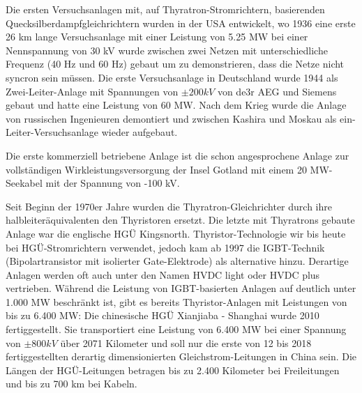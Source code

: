 Die ersten Versuchsanlagen mit, auf Thyratron-Stromrichtern, basierenden Quecksilberdampfgleichrichtern wurden in der USA entwickelt, wo 1936 eine erste 26 km lange Versuchsanlage mit einer Leistung von 5.25 MW bei einer Nennspannung von 30 kV wurde zwischen zwei Netzen mit unterschiedliche Frequenz (40 Hz und 60 Hz) gebaut um zu demonstrieren, dass die Netze nicht syncron sein müssen. Die erste Versuchsanlage in Deutschland wurde 1944 als Zwei-Leiter-Anlage mit Spannungen von $\pm 200 kV$ von de3r AEG und Siemens gebaut und hatte eine Leistung von 60 MW. Nach dem Krieg wurde die Anlage von russischen Ingenieuren demontiert und zwischen Kashira und Moskau als ein-Leiter-Versuchsanlage wieder aufgebaut.

Die erste kommerziell betriebene Anlage ist die schon angesprochene Anlage zur vollständigen Wirkleistungsversorgung der Insel Gotland mit einem 20 MW-Seekabel mit der Spannung von -100 kV.

Seit Beginn der 1970er Jahre wurden die Thyratron-Gleichrichter durch ihre halbleiteräquivalenten den Thyristoren ersetzt. Die letzte mit Thyratrons gebaute Anlage war die englische HGÜ Kingsnorth. Thyristor-Technologie wir bis heute bei HGÜ-Stromrichtern verwendet, jedoch kam ab 1997 die IGBT-Technik (Bipolartransistor mit isolierter Gate-Elektrode) als alternative hinzu. Derartige Anlagen werden oft auch unter den Namen HVDC light oder HVDC plus vertrieben.
Während die Leistung von IGBT-basierten Anlagen auf deutlich unter 1.000 MW beschränkt ist, gibt es bereits Thyristor-Anlagen mit Leistungen von bis zu 6.400 MW:
Die chinesische HGÜ Xianjiaba - Shanghai wurde 2010 fertiggestellt.\cite{Kao}
Sie transportiert eine Leistung von 6.400 MW bei einer Spannung von $\pm800 kV$ über 2071 Kilometer und
soll nur die erste von 12 bis 2018 fertiggestellten derartig dimensionierten Gleichstrom-Leitungen in China sein.\cite{Liste}
Die Längen der HGÜ-Leitungen betragen bis zu 2.400 Kilometer bei Freileitungen und bis zu 700 km bei Kabeln.\cite{Liste} 

